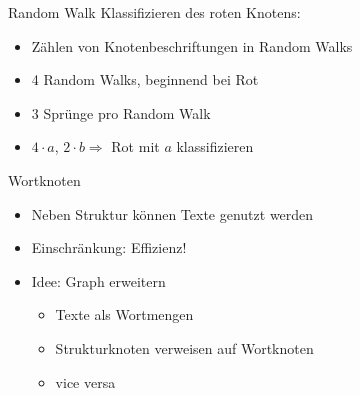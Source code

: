 \begin{frame}{Random Walk}
    Klassifizieren des roten Knotens:
    \begin{itemize}
        \item Zählen von Knotenbeschriftungen in Random Walks
        \item 4 Random Walks, beginnend bei Rot
        \item 3 Sprünge pro Random Walk
        \item<11> $4 \cdot a$, $2 \cdot b \Rightarrow$ Rot mit $a$ klassifizieren
    \end{itemize}
\end{frame}

\begin{frame}{Wortknoten}
    \begin{itemize}
        \item<1-> Neben Struktur können Texte genutzt werden
        \item<2-> Einschränkung: Effizienz!
        \item<3-> Idee: Graph erweitern
        \begin{itemize}
            \item<4-> Texte als Wortmengen
            \item<5-> Strukturknoten verweisen auf Wortknoten
            \item<6-> vice versa
        \end{itemize}
    \end{itemize}
\end{frame}

